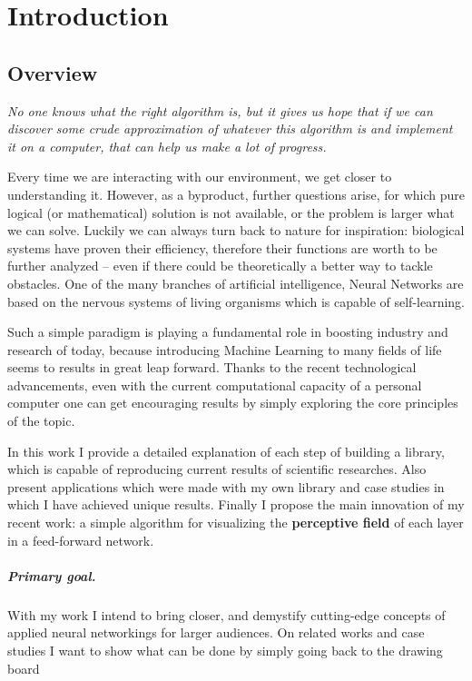 \chapter{Introduction}
\section{Overview}


\epigraph{\textit{No one knows what the right algorithm is, but it gives us hope that if we can discover some crude approximation of whatever this algorithm is and implement it on a computer, that can help us make a lot of progress.}}{}

Every time we are interacting with our environment, we get closer to understanding it. %
However, as a byproduct, further questions arise, for which pure logical (or mathematical) solution is not available, or the problem is larger what we can solve.
Luckily we can always turn back to nature for inspiration: biological systems have proven their efficiency, therefore their functions are worth to be further analyzed -- even if there could be theoretically a better way to tackle obstacles. 
One of the many branches of artificial intelligence, Neural Networks are based on the nervous systems of living organisms which is capable of self-learning.

Such a simple paradigm is playing a fundamental role in boosting 
industry and research of today, because introducing Machine Learning to many fields of life seems to results in great leap forward. 
Thanks to the recent technological advancements, even with the current computational capacity of a personal computer one can get encouraging results by simply exploring the core principles of the topic. 

In this work I provide a detailed explanation of each step of building a library,
which is capable of reproducing current results of scientific researches.
Also present applications which were made with my own library and case studies in which I have achieved unique results.
Finally I propose the main innovation of my recent work: a simple algorithm for visualizing the \textbf{perceptive field} of each layer in a feed-forward network.

\paragraph{Primary goal.} With my work I intend to bring closer, and demystify cutting-edge concepts of applied neural networkings for larger audiences. 
On related works and case studies I want to show what can be done by simply going back to the drawing board


